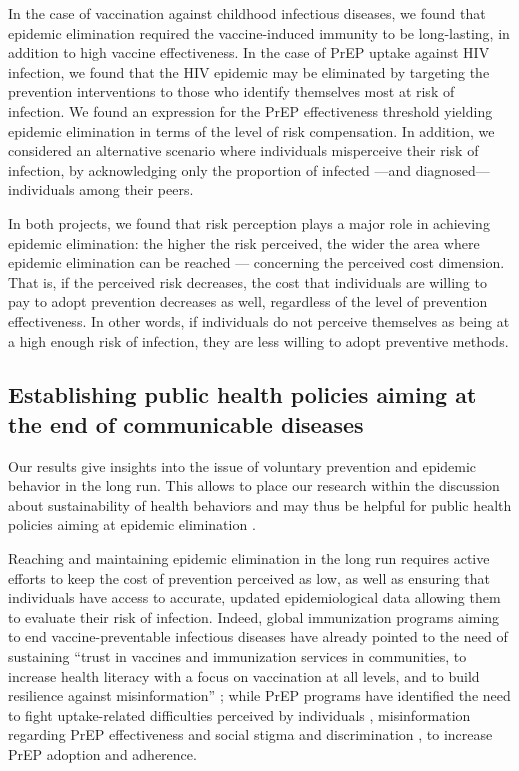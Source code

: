 In the case of vaccination against childhood infectious diseases, we found that epidemic elimination required the vaccine-induced immunity to be long-lasting, in addition to high vaccine effectiveness. In the case of PrEP uptake against HIV infection, we found that the HIV epidemic may be eliminated by targeting the prevention interventions to those who identify themselves most at risk of infection. We found an expression for the PrEP effectiveness threshold yielding epidemic elimination in terms of the level of risk compensation. In addition, we considered an alternative scenario where individuals misperceive their risk of infection, by acknowledging only the proportion of infected ---and diagnosed--- individuals among their peers. %

In both projects, we found that risk perception plays a major role in achieving epidemic elimination: the higher the risk perceived, the wider the area where epidemic elimination can be reached --- concerning the perceived cost dimension. That is, if the perceived risk decreases, the cost that individuals are willing to pay to adopt prevention decreases as well, regardless of the level of prevention effectiveness. In other words, if individuals do not perceive themselves as being at a high enough risk of infection, they are less willing to adopt preventive methods. 

\subsection{Establishing public health policies aiming at the end of communicable diseases}

Our results give insights into the issue of voluntary prevention and epidemic behavior in the long run. This allows to place our research within the discussion about sustainability of health behaviors and may thus be helpful for public health policies aiming at epidemic elimination \cite[]{SDG_Goal3}.  

Reaching and maintaining epidemic elimination in the long run requires active efforts to keep the cost of prevention perceived as low, as well as ensuring that individuals have access to accurate, updated epidemiological data allowing them to evaluate their risk of infection. Indeed, global immunization programs aiming to end vaccine-preventable infectious diseases have already pointed to the need of sustaining ``trust in vaccines and immunization services in communities, to increase health literacy with a focus on vaccination at all levels, and to build resilience against misinformation'' \cite[]{WHO_IA2030}; while PrEP programs have identified the need to fight uptake-related difficulties perceived by individuals \cite[]{Desai2018,Sidebottom2018}, misinformation regarding PrEP effectiveness \cite[]{Young2014,Underhill2016} and social stigma and discrimination \cite[]{Young2014,PerezFigueroa2015,Arnold2016}, to increase PrEP adoption and adherence.

